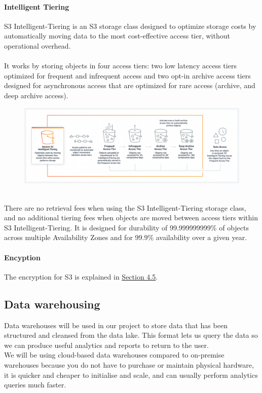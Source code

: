 \documentclass[10pt]{article}
\begin{document}
\paragraph{Intelligent Tiering}
S3 Intelligent-Tiering \cite{S3-storage-classes} is an S3 storage class designed to optimize storage costs by automatically moving data to the most cost-effective access tier, without operational overhead.\\ \\
It works by storing objects in four access tiers: two low latency access tiers optimized for frequent and infrequent access and two opt-in archive access tiers designed for asynchronous access that are optimized for rare access (archive, and deep archive access).\\
\begin{figure}[h!]
   	\centering
   	\includegraphics[width=1\linewidth]{images/S3-Intelligent-Tiering.png}	
\end{figure} \\
There are no retrieval fees when using the S3 Intelligent-Tiering storage class, and no additional tiering fees when objects are moved between access tiers within S3 Intelligent-Tiering. It is designed for durability of 99.999999999\% of objects across multiple Availability Zones and for 99.9\% availability over a given year.
\paragraph{Encyption} The encryption for S3 is explained in \hyperref[sec:secure_access]{Section 4.5}. 

\newpage
\subsection{Data warehousing}
Data warehouses will be used in our project to store data that has been structured and cleansed from the data lake. This format lets us query the data so we can produce useful analytics and reports to return to the user.
\\
We will be using cloud-based data warehouses compared to on-premise warehouses because you do not have to purchase or maintain physical hardware, it is quicker and cheaper to initialise and scale, and can usually perform analytics queries much faster.
\end{document}
